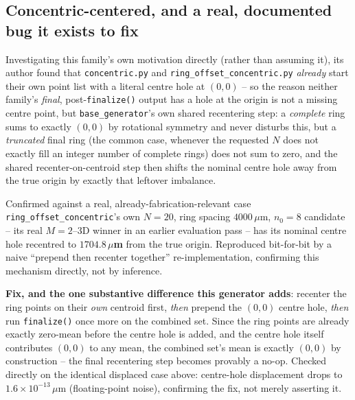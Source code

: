 \subsection{Concentric-centered, and a real, documented bug it exists to fix}
\label{sec:centered-bug}
Investigating this family's own motivation directly (rather than assuming it), its
author found that \texttt{concentric.py} and \texttt{ring\_offset\_concentric.py}
\emph{already} start their own point list with a literal centre hole at $(0,0)$ -- so
the reason neither family's \emph{final}, post-\texttt{finalize()} output has a hole at
the origin is not a missing centre point, but \texttt{base\_generator}'s own shared
recentering step: a \emph{complete} ring sums to exactly $(0,0)$ by rotational
symmetry and never disturbs this, but a \emph{truncated} final ring (the common case,
whenever the requested $N$ does not exactly fill an integer number of complete rings)
does not sum to zero, and the shared recenter-on-centroid step then shifts the nominal
centre hole away from the true origin by exactly that leftover imbalance.

\begin{warnbox}{Confirmed against a real, already-fabrication-relevant case}
\texttt{ring\_offset\_concentric}'s own $N=20$, ring spacing $4000\,\mu$m, $n_0=8$
candidate -- its real $M=2$--$3$D winner in an earlier evaluation pass -- has its
nominal centre hole recentred to \textbf{$1704.8\,\mu$m} from the true origin.
Reproduced bit-for-bit by a naive ``prepend then recenter together'' re-implementation,
confirming this mechanism directly, not by inference.
\end{warnbox}

\textbf{Fix, and the one substantive difference this generator adds}: recenter the
ring points on their \emph{own} centroid first, \emph{then} prepend the $(0,0)$ centre
hole, \emph{then} run \texttt{finalize()} once more on the combined set. Since the ring
points are already exactly zero-mean before the centre hole is added, and the centre
hole itself contributes $(0,0)$ to any mean, the combined set's mean is exactly
$(0,0)$ by construction -- the final recentering step becomes provably a no-op. Checked
directly on the identical displaced case above: centre-hole displacement drops to
$1.6\times10^{-13}\,\mu$m (floating-point noise), confirming the fix, not merely
asserting it.

